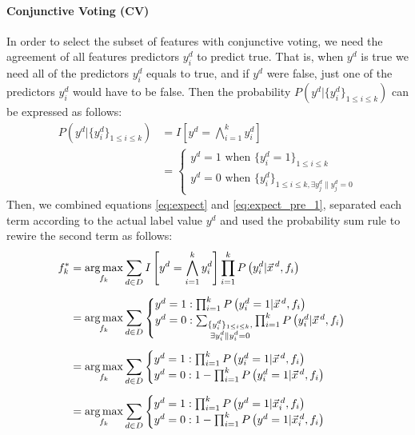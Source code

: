 \paragraph{Conjunctive Voting (CV)}
In order to select the subset of features with conjunctive voting, 
we need the agreement of all features predictors
$y^d_i$ to predict true. That is, when $y^d$ is true we need all of
the predictors $y^d_i$ equals to true, and if $y^d$ were false, just
one of the predictors $y^d_i$ would have to be false. Then the
probability $P\left(y^d|\{y^d_i\}_{1\leq i\leq k}\right)$ can be
expressed as follows:
{\small 
\begin{align}
P\left(y^d|\{y^d_i\}_{1\leq i\leq k}\right) & =I\left[y^d=\bigwedge_{i=1}^k y^d_i\right] \nonumber\\
&= \begin{cases}
	y^d=1 \text{ when } \{y_i^d=1\}_{1\leq i\leq k}\\
	y^d=0 \text{ when } \{y_i^d\}_{1\leq i\leq k,\exists{y_j^d\|y_j^d=0}}
\end{cases}\label{eq:expect_pre_1}
\end{align}}
Then, we combined equations \eqref{eq:expect} and
\eqref{eq:expect_pre_1}, separated each term according to the actual
label value $y^d$ and used the probability sum rule to rewire the
second term as follows:
\begin{align}
f_k^*&=\argmax_{f_k}\sum_{d\in D}I\left[y^d=\bigwedge_{i=1}^k y^d_i\right]\prod_{i=1}^kP\left(y_i^d|\vec{x}^{\,d},f_i\right)\nonumber\\[0.5em]
&=\argmax_{f_k}\sum_{d\in D}
\begin{cases}
	y^d=1: \prod_{i=1}^kP\left(y_i^d=1|\vec{x}^{\,d},f_i\right)\\
	y^d=0: \sum_{\substack{\{y_i^d\}_{1\leq i\leq k},\\ \exists{y_i^d\|y_i^d=0}}}\prod_{i=1}^kP\left(y_i^d|\vec{x}^{\,d},f_i\right)
\end{cases}\nonumber\\[0.5em]
&=\argmax_{f_k}\sum_{d\in D}
\begin{cases}
	y^d=1: \prod_{i=1}^kP\left(y_i^d = 1|\vec{x}^{\,d},f_i\right)\\
	y^d=0: 1-\prod_{i=1}^kP\left(y_i^d = 1|\vec{x}^{\,d},f_i\right)
\end{cases}\label{eq:expect_pre_2}\\[0.5em]
&=\argmax_{f_k}\sum_{d\in D}
\begin{cases}
	y^d=1: \prod_{i=1}^kP\left(y^d = 1|\vec{x}_i^{\,d},f_i\right)\\
	y^d=0: 1-\prod_{i=1}^kP\left(y^d = 1|\vec{x}_i^{\,d},f_i\right)\nonumber
\end{cases}
\end{align}
